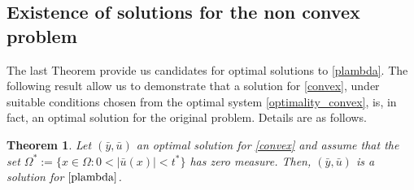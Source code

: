 \documentclass[11pt,a4paper]{amsart}
\newcommand{\om}{\Omega}
\newtheorem{theorem}{{Theorem}}
\begin{document}
\subsection{Existence of solutions for the non convex problem}

The last Theorem provide us candidates for optimal solutions to \eqref{plambda}. The following result allow us to demonstrate that a solution for \eqref{convex}, under suitable conditions chosen from the optimal system \eqref{optimality_convex}, is, in fact, an optimal solution for the original problem. Details are as follows.

\begin{theorem}
    Let $(\bar{y},\bar{u})$ an optimal solution for \eqref{convex} and assume that the set $\om^*:=\{x\in \om: 0<|\bar{u}(x)|<t^*\}$ has zero measure. Then, $(\bar{y},\bar{u})$ is a solution for $\eqref{plambda}$.
\end{theorem}
\end{document}
